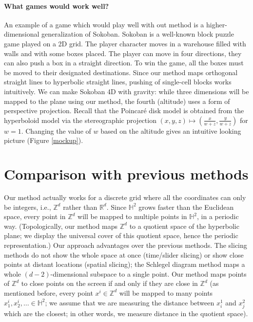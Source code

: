 \documentclass{article}
\begin{document}
\paragraph{What games would work well?} An example of a game which would play well with out method is a higher-dimensional generalization
of Sokoban. Sokoban is a well-known block puzzle game played on a 2D grid. The player character moves in a warehouse
filled with walls and with some boxes placed. The player can move in four directions, they can also push a box in a straight
direction. To win the game, all the boxes must be moved to their designated destinations.
Since our method maps orthogonal straight lines
to hyperbolic straight lines, pushing of single-cell blocks works intuitively. We can make Sokoban 4D with gravity: 
while three dimensions will be mapped to the
plane using our method, the fourth (altitude) uses a form of perspective projection. Recall that the Poincar\'e disk model
is obtained from the hyperboloid model via the stereographic projection $(x,y,z) \mapsto (\frac{x}{w+z}, \frac{y}{w+z})$ for $w=1$. 
Changing the value of $w$ based on the altitude gives an intuitive looking picture (Figure \ref{mockup}).

\section{Comparison with previous methods}
Our method actually 
works for a discrete grid where all the coordinates can only be integers,
i.e., $\mathbb{Z}^d$ rather than $\mathbb{R}^d$. 
Since $\mathbb{H}^2$ grows faster than the Euclidean space, every point in
$\mathbb{Z}^d$ will be mapped to multiple points in $\mathbb{H}^2$, in 
a periodic way. (Topologically, our method maps $\mathbb{Z}^d$ to a quotient
space of the hyperbolic plane; we display the universal cover of this quotient
space, hence the periodic representation.)
Our approach advantages over the previous methods. The slicing methods do not show the whole space at once (time/slider slicing)
or show close points at distant locations (spatial slicing); the Schlegel
diagram method maps a whole $(d-2)$-dimensional subspace to a single point.
Our method maps points of $\mathbb{Z}^d$  to close points on the screen if and only if they are close in 
$\mathbb{Z}^d$ (as mentioned before, every point $x^i \in \mathbb{Z}^d$ will be 
mapped to many points $x^i_1, x^i_2, \ldots \in \mathbb{H}^2$; we assume that
we are measuring the distance between $x^1_i$ and $x^2_j$ which are the closest;
in other words, we measure distance in the quotient space).
\end{document}
